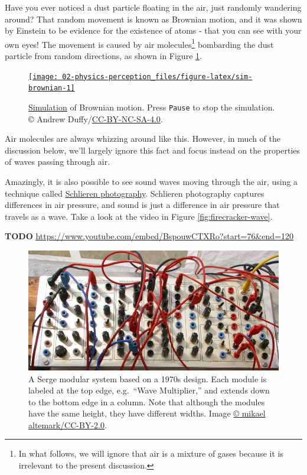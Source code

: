 \documentclass[
]{book}
\begin{document}
Have you ever noticed a dust particle floating in the air, just randomly wandering around?
That random movement is known as Brownian motion, and it was shown by Einstein to be evidence for the existence of atoms - that you can see with your own eyes!
The movement is caused by air molecules\footnote{In what follows, we will ignore that air is a mixture of gases because it is irrelevant to the present discussion.} bombarding the dust particle from random directions, as shown in Figure \ref{fig:sim-brownian}.



\begin{figure}
\href{https://physics.bu.edu/~duffy/HTML5/brownian_motion.html}{\texttt{[image: 02-physics-perception\_files/figure-latex/sim-brownian-1]} }\caption{\href{https://physics.bu.edu/~duffy/HTML5/brownian_motion.html}{Simulation} of Brownian motion. Press \texttt{Pause} to stop the simulation. © Andrew Duffy/\href{https://creativecommons.org/licenses/by-nc-sa/4.0/}{CC-BY-NC-SA-4.0}.}\label{fig:sim-brownian}
\end{figure}

Air molecules are always whizzing around like this.
However, in much of the discussion below, we'll largely ignore this fact and focus instead on the properties of waves passing through air.

Amazingly, it is also possible to see sound waves moving through the air, using a technique called \href{https://en.wikipedia.org/wiki/Schlieren_photography}{Schlieren photography}.
Schlieren photography captures differences in air pressure, and sound is just a difference in air pressure that travels as a wave.
Take a look at the video in Figure \ref{fig:firecracker-wave}.

\textbf{TODO} \url{https://www.youtube.com/embed/BspouwCTXRo?start=76\&end=120}



\begin{figure}
\includegraphics[width=1\linewidth]{images/Serge_Modular,_Norbergfestival_2007_cropped} \caption{A Serge modular system based on a 1970s design. Each module is labeled at the top edge, e.g.~``Wave Multiplier,'' and extends down to the bottom edge in a column. Note that although the modules have the same height, they have different widths. Image \href{https://commons.wikimedia.org/wiki/File:Serge_Modular,_Norbergfestival_2007.jpg}{© mikael altemark/CC-BY-2.0}.}\label{fig:serge-modular}
\end{figure}
\end{document}
